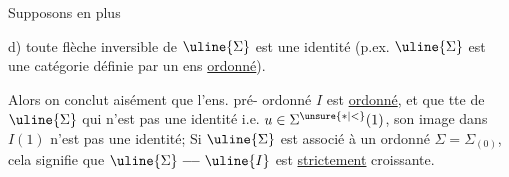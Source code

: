 Supposons en plus

d) toute flèche inversible de $\uline{\Sigma}$ est une identité
(p.ex. $\uline{\Sigma}$ est une catégorie définie par un ens
\uline{ordonné}).

Alors on conclut aisément que l'ens. pré-%
ordonné $I$ est \uline{ordonné}, et que tte 
de $\uline{\Sigma}$ qui n'est pas une identité i.e. $u\in\Sigma^{\unsure{*|<}}(1)$,
son image dans $I(1)$ n'est pas une identité;
 Si $\uline{\Sigma}$ est associé à un
ordonné $\Sigma=\Sigma_{(0)}$, cela signifie que
$\uline{\Sigma}\mathrel{\relbar\joinrel\relbar}\uline{I}$ est 
\uline{strictement} croissante.

